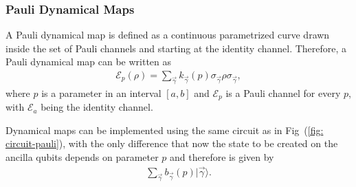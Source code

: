 \documentclass[10pt,letterpaper]{article}
\begin{document}
\subsubsection*{Pauli Dynamical Maps}
\label{subsec: Pauli Dynamical Maps}

A Pauli dynamical map is defined as a continuous parametrized 
curve drawn inside the set of Pauli channels and starting at the identity channel. 
Therefore, a Pauli dynamical map can be written as
\begin{eqnarray}
\label{ec: Pauli dynamical map}
\mathcal{E}_p(\rho) = \sum_{\vec{\gamma}} k_{\vec{\gamma}}(p) \sigma_{\vec{\gamma}} \rho \sigma_{\vec{\gamma}},
\end{eqnarray}
where $p$ is a parameter in an interval $[a,b]$ 
and $\mathcal{E}_p$ is a Pauli channel for every $p$, 
with $\mathcal{E}_a$ being the identity channel.

Dynamical maps can be implemented using the same circuit as 
in Fig~(\ref{fig: circuit-pauli}), with the only difference that now the state 
to be created on the ancilla qubits depends on parameter $p$ 
and therefore is given by 
\begin{eqnarray}
\label{ec: parametrized state}
\sum_{\vec{\gamma}} b_{\vec{\gamma}}(p) |\vec{\gamma}\rangle.
\end{eqnarray}
\end{document}
